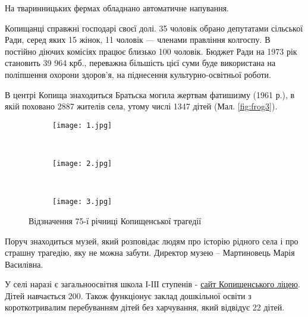 На тваринницьких фермах обладнано автоматичне напування.

Копищанці справжні господарі своєї долі. 35 чоловік обрано депутатами сільської Ради, серед яких 15 жінок, 11 чоловік — членами правління колгоспу. В постійно діючих комісіях працює близько 100 чоловік. Бюджет Ради на 1973 рік становить 39 964 крб., переважна більшість цієї суми буде використана на поліпшення охорони здоров’я, на піднесення культурно-освітньої роботи.

В центрі Копища знаходиться Братьска могила жертвам фатишизму (1961 р.), в якій поховано 2887 жителів села, утому числі 1347 дітей (Мал. \ref{fig:frog3}).
\begin{figure}
	\centering
	\begin{subfigure}[b]{0.3\textwidth}
		\texttt{[image: 1.jpg]}
		\caption{}
		\label{fig:gull}
	\end{subfigure}
	~ %
	\begin{subfigure}[b]{0.3\textwidth}
		\texttt{[image: 2.jpg]}
		\caption{}
		\label{fig:tiger}
	\end{subfigure}
	~ %
	\begin{subfigure}[b]{0.3\textwidth}
		\texttt{[image: 3.jpg]}
		\caption{}
		\label{fig:mouse}
		\end{subfigure}
	\caption{\label{fig:frog4}Відзначення 75-ї річниці Копищенської трагедії}\label{fig:animals}
\end{figure}

Поруч знаходиться музей, який розповідає людям про історію рідного села і про страшну трагедію, яку не можна забути. Директор музею – Мартиновець Марія Василівна.

У селі наразі є загальноосвітня школа І-ІІІ ступенів - \href{https://sites.google.com/kopische.ukr.education/sites/}%
{сайт Копищенського ліцею}.  Дітей навчається 200. Також функціонує заклад дошкільної освіти з короткотривалим перебуванням дітей без харчування, який відвідує 22 дітей.





